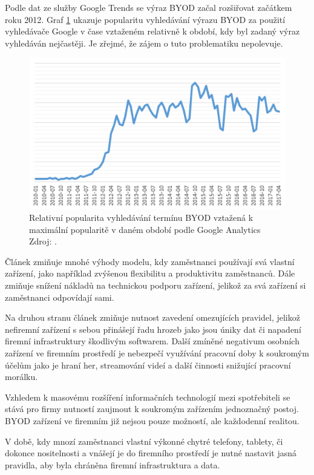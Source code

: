 Podle dat ze služby Google Trends \cite{GoogleTrends} se výraz BYOD začal rozšiřovat začátkem roku 2012. Graf \ref{hledaniBYOD} ukazuje popularitu vyhledávání výrazu BYOD za použití vyhledávače Google v čase vztaženém relativně k období, kdy byl zadaný výraz vyhledáván nejčastěji. Je zřejmé, že zájem o tuto problematiku nepolevuje.

\begin{figure}[h!]\label{hledaniBYOD}
\centering
\includegraphics[width=13cm]{img/hledaniBYOD}
\caption{Relativní popularita vyhledávání termínu BYOD vztažená k maximální popularitě v daném období podle Google Analytics Zdroj: \cite{GoogleTrends}.} 
\end{figure}
 

Článek \cite{stagliano2013consumerization} zmiňuje mnohé výhody modelu, kdy zaměstnanci používají svá vlastní zařízení, jako například zvýšenou flexibilitu a produktivitu zaměstnanců. Dále zmiňuje snížení nákladů na technickou podporu zařízení, jelikož za svá zařízení si zaměstnanci odpovídají sami.

Na druhou stranu článek zmiňuje nutnost zavedení omezujících pravidel, jelikož nefiremní zařízení s sebou přinášejí řadu hrozeb jako jsou úniky dat či napadení firemní infrastruktury škodlivým softwarem.  Další zmíněné negativum osobních zařízení ve firemním prostředí je nebezpečí využívání pracovní doby k soukromým účelům jako je hraní her, streamování videí a další činnosti snižující pracovní morálku.

Vzhledem k masovému rozšíření informačních technologií mezi spotřebiteli se stává pro firmy nutností zaujmout k soukromým zařízením jednoznačný postoj. BYOD zařízení ve firemním již nejsou pouze možností, ale každodenní realitou.

V době, kdy mnozí zaměstnanci vlastní výkonné chytré telefony, tablety, či dokonce nositelnosti a vnášejí je do firemního prostředí je nutné nastavit jasná pravidla, aby byla chráněna firemní infrastruktura a data.

